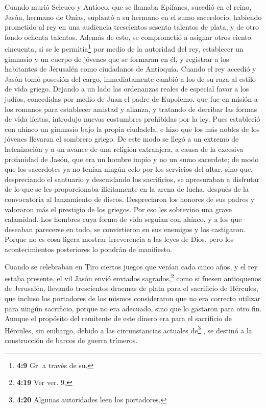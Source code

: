  Cuando murió Seleuco y Antíoco, que se llamaba Epífanes,
sucedió en el reino, Jasón, hermano de Onías, suplantó a su hermano en
el sumo sacerdocio,  habiendo prometido al rey en una
audiencia trescientos sesenta talentos de plata, y de otro fondo ochenta
talentos.  Además de esto, se comprometió a asignar otros
ciento cincuenta, si se le permitía\footnote{\textbf{4:9} Gr. a través
  de su.} por medio de la autoridad del rey, establecer un gimnasio y un
cuerpo de jóvenes que se formaran en él, y registrar a los habitantes de
Jerusalén como ciudadanos de Antioquía.  Cuando el rey
accedió y Jasón tomó posesión del cargo, inmediatamente cambió a los de
su raza al estilo de vida griego.  Dejando a un lado las
ordenanzas reales de especial favor a los judíos, concedidas por medio
de Juan el padre de Eupolemo, que fue en misión a los romanos para
establecer amistad y alianza, y tratando de derribar las formas de vida
lícitas, introdujo nuevas costumbres prohibidas por la ley.
 Pues estableció con ahínco un gimnasio bajo la propia
ciudadela, e hizo que los más nobles de los jóvenes llevaran el sombrero
griego.  De este modo se llegó a un extremo de
helenización y a un avance de una religión extranjera, a causa de la
excesiva profanidad de Jasón, que era un hombre impío y no un sumo
sacerdote;  de modo que los sacerdotes ya no tenían
ningún celo por los servicios del altar, sino que, despreciando el
santuario y descuidando los sacrificios, se apresuraban a disfrutar de
lo que se les proporcionaba ilícitamente en la arena de lucha, después
de la convocatoria al lanzamiento de discos. 
Despreciaron los honores de sus padres y valoraron más el prestigio de
los griegos.  Por eso les sobrevino una grave calamidad.
Los hombres cuya forma de vida seguían con ahínco, y a los que deseaban
parecerse en todo, se convirtieron en sus enemigos y los castigaron.
 Porque no es cosa ligera mostrar irreverencia a las
leyes de Dios, pero los acontecimientos posteriores lo pondrán de
manifiesto.

 Cuando se celebraban en Tiro ciertos juegos que venían
cada cinco años, y el rey estaba presente,  el vil Jasón
envió enviados sagrados,\footnote{\textbf{4:19} Ver ver. 9.} como si
fuesen antioquenos de Jerusalén, llevando trescientos dracmas de plata
para el sacrificio de Hércules, que incluso los portadores de los mismos
consideraron que no era correcto utilizar para ningún sacrificio, porque
no era adecuado, sino que lo gastaron para otro fin. 
Aunque el propósito del remitente de este dinero era para el sacrificio
de Hércules, sin embargo, debido a las circunstancias actuales
de\footnote{\textbf{4:20} Algunas autoridades leen los portadores.} , se
destinó a la construcción de barcos de guerra trímeros.


